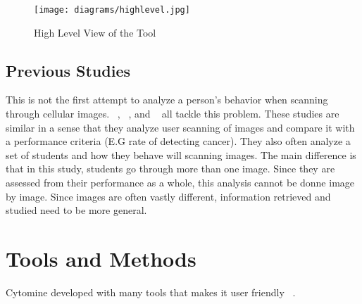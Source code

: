 \documentclass[a4paper,11pt]{report}
\numberwithin{figure}{section} %
\begin{document}
      \begin{figure}[H]
      \centering
      \texttt{[image: diagrams/highlevel.jpg]}
      \caption{High Level View of the Tool}
      \label{fig:highlevel}
      \end{figure}

\section{Previous Studies}

This is not the first attempt to analyze a person's behavior when scanning through cellular images.
~\cite{pathedex}, ~\cite{pathexams}, and ~\cite{pathinterations} all tackle this problem.
These studies are similar in a sense that they analyze user scanning of images and compare it with a performance criteria (E.G rate of detecting cancer).
They also often analyze a set of students and how they behave will scanning images.
The main difference is that in this study, students go through more than one image.
Since they are assessed from their performance as a whole, this analysis cannot be donne image by image.
Since images are often vastly different, information retrieved and studied need to be more general.


\chapter{Tools and Methods}

    Cytomine developed with many tools that makes it user friendly ~\cite{cyt}.
\end{document}
